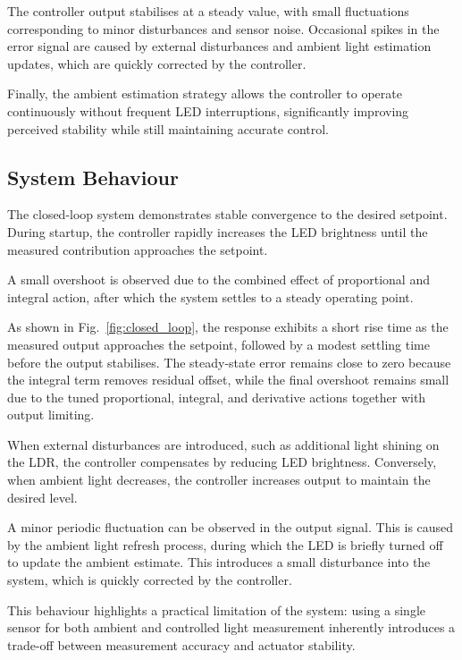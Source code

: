 \documentclass[conference]{IEEEtran}
\begin{document}
The controller output stabilises at a steady value, with small fluctuations corresponding to minor disturbances and sensor noise. Occasional spikes in the error signal are caused by external disturbances and ambient light estimation updates, which are quickly corrected by the controller.

Finally, the ambient estimation strategy allows the controller to operate continuously without frequent LED interruptions, significantly improving perceived stability while still maintaining accurate control.

\subsection{System Behaviour}

The closed-loop system demonstrates stable convergence to the desired setpoint. During startup, the controller rapidly increases the LED brightness until the measured contribution approaches the setpoint.

A small overshoot is observed due to the combined effect of proportional and integral action, after which the system settles to a steady operating point.

As shown in Fig.~\ref{fig:closed_loop}, the response exhibits a short rise time as the measured output approaches the setpoint, followed by a modest settling time before the output stabilises. The steady-state error remains close to zero because the integral term removes residual offset, while the final overshoot remains small due to the tuned proportional, integral, and derivative actions together with output limiting.

When external disturbances are introduced, such as additional light shining on the LDR, the controller compensates by reducing LED brightness. Conversely, when ambient light decreases, the controller increases output to maintain the desired level.

A minor periodic fluctuation can be observed in the output signal. This is caused by the ambient light refresh process, during which the LED is briefly turned off to update the ambient estimate. This introduces a small disturbance into the system, which is quickly corrected by the controller.

This behaviour highlights a practical limitation of the system: using a single sensor for both ambient and controlled light measurement inherently introduces a trade-off between measurement accuracy and actuator stability.
\end{document}
